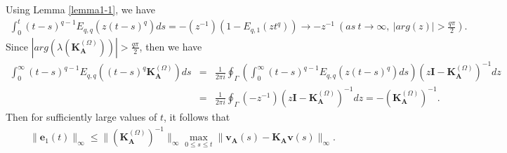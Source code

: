 \documentclass[9pt]{article}
\numberwithin{equation}{section}
\begin{document}
Using Lemma \ref{lemma1-1}, we have
\begin{eqnarray}\label{wer4z}
\int_{0}^{t}(t-s)^{q -1}E_{q ,q }(z(t-s)^{q })ds=-(z^{-1})(1-E_{q ,1 }(zt^{q }))\rightarrow -z^{-1}~ (as ~t \rightarrow \infty,~|arg(z)|>\frac{q \pi}{2}).
\end{eqnarray}
Since $|arg(\lambda(\textbf{K}^{(\Omega)}_{\mathbf{A}}))|>\frac{q \pi}{2}$, then we have
\begin{eqnarray*}
\int_{0}^{\infty}(t-s)^{q -1}E_{q ,q }((t-s)^{q }\textbf{K}^{(\Omega)}_{\mathbf{A}})ds&=&\frac{1}{2\pi i}\oint_{\Gamma}\left(\int_{0}^{\infty}(t-s)^{q -1}E_{q,q }(z(t-s)^{q })ds\right)(z\textbf{I}-\textbf{K}^{(\Omega)}_{\mathbf{A}})^{-1}dz\nonumber\\
&=&\frac{1}{2\pi i}\oint_{\Gamma}(-z^{-1})(z\textbf{I}-\textbf{K}^{(\Omega)}_{\mathbf{A}})^{-1}dz=-(\textbf{K}^{(\Omega)}_{\mathbf{A}})^{-1}.
\end{eqnarray*}
Then for sufficiently large values of $t$, it follows that
\begin{eqnarray}\label{ret11}
\|\textbf{e}_{1}(t)\|_{\infty}\leq  \|(\textbf{K}^{(\Omega)}_{\mathbf{A}})^{-1}\|_{\infty}\max_{0\leq s \leq t} \|\textbf{v}_{\mathbf{A}}(s)-\textbf{K}_{\mathbf{A}}\textbf{v}(s)\|_{\infty}.
\end{eqnarray}
\end{document}
